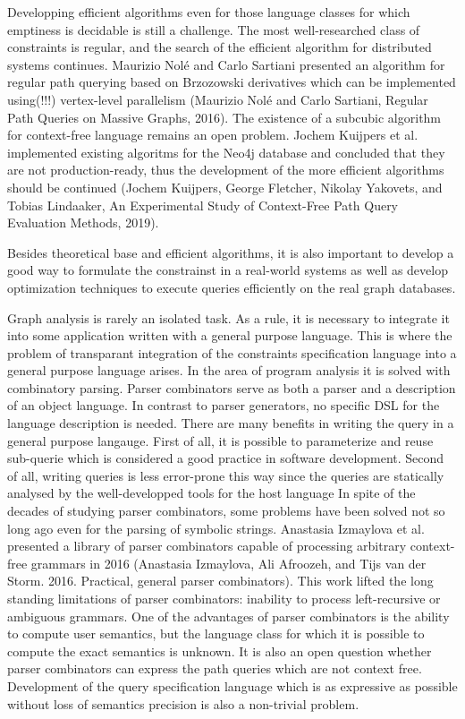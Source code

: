 \documentclass[12pt]{article}  %
\theoremstyle{remark}
\begin{document}
Developping efficient algorithms  even for those language classes for which emptiness is decidable is still a challenge.
The most well-researched class of constraints is regular, and the search of the efficient algorithm for distributed systems continues.
Maurizio Nolé and Carlo Sartiani presented an algorithm for regular path querying based on Brzozowski derivatives which can be implemented using(!!!) vertex-level parallelism (Maurizio Nolé and Carlo Sartiani, Regular Path Queries on Massive Graphs, 2016).
The existence of a subcubic algorithm for context-free language remains an open problem.
Jochem Kuijpers et al. implemented existing algoritms for the Neo4j database and concluded that they are not production-ready, thus the development of the more efficient algorithms should be continued (Jochem Kuijpers, George Fletcher, Nikolay Yakovets, and Tobias Lindaaker, An Experimental Study of Context-Free Path Query Evaluation Methods,  2019).

Besides theoretical base and efficient algorithms, it is also important to develop a good way to formulate the constrainst in a real-world systems as well as develop optimization techniques to execute queries efficiently on the real graph databases.

Graph analysis is rarely an isolated task.
As a rule, it is necessary to integrate it into some application written with a general purpose language.
This is where the problem of transparant integration of the constraints specification language into a general purpose language arises.
In the area of program analysis it is solved with combinatory parsing.
Parser combinators serve as both a parser and a description of an object language.
In contrast to parser generators, no specific DSL for the language description is needed.
There are many benefits in writing the query in a general purpose langauge.
First of all, it is possible to parameterize and reuse sub-querie which is considered a good practice in software development.
Second of all, writing queries is less error-prone this way since the queries are statically analysed by the well-developped tools for the host language
In spite of the decades of studying parser combinators, some problems have been solved not so long ago even for the parsing of symbolic strings.
Anastasia Izmaylova et al. presented a library of parser combinators capable of processing arbitrary context-free grammars in 2016 (Anastasia Izmaylova, Ali Afroozeh, and Tijs van der Storm. 2016. Practical, general parser combinators).
This work lifted the long standing limitations of parser combinators: inability to process left-recursive or ambiguous grammars.
One of the advantages of parser combinators is the ability to compute user semantics, but the language class for which it is possible to compute the exact semantics is unknown.
It is also an open question whether parser combinators can express the path queries which are not context free.
Development of the query specification language which is as expressive as possible without loss of semantics precision is also a non-trivial problem.
\end{document}
